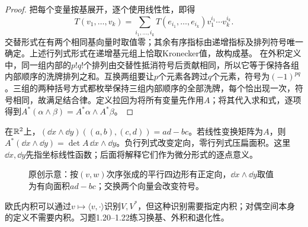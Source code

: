 \begin{proof}
把每个变量按基展开，逐个使用线性性，即得
\[
 T(v_1,\ldots,v_k)=\sum_{i_1,\ldots,i_k}T(e_{i_1},\ldots,e_{i_k})v_1^{i_1}\cdots v_k^{i_k}.
\]
交替形式在有两个相同基向量时取值零；其余有序指标由递增指标及排列符号唯一确定。上述行列式形式在递增基元组上恰取Kronecker值，故构成基。
在外积定义中，同一组内部的$p!q!$个排列由交替性抵消符号后贡献相同，所以它等于保持各组内部顺序的洗牌排列之和。互换两组要让$p$个元素各跨过$q$个元素，符号为$(-1)^{pq}$。三组的两种括号方式都枚举保持三组内部顺序的全部洗牌，每个恰出现一次，符号相同，故满足结合律。定义拉回为将所有变量先作用$A$；将其代入求和式，逐项得到$A^*(\alpha\wedge\beta)=A^*\alpha\wedge A^*\beta$。
\end{proof}
\begin{example}[行列式与面积形式]
在$\mathbb{R}^2$上，$(\dd x\wedge\dd y)((a,b),(c,d))=ad-bc$。若线性变换矩阵为$A$，则$A^*(\dd x\wedge\dd y)=\det A\,\dd x\wedge\dd y$。负行列式改变定向，零行列式压扁面积。这里$\dd x,\dd y$先指坐标线性函数；后面将解释它们作为微分形式的逐点意义。
\end{example}
\begin{figure}[htbp]
\centering

\caption{原创示意：按$(v,w)$次序张成的平行四边形有正定向，$\dd x\wedge\dd y$取值为有向面积$ad-bc$；交换两个向量会改变符号。}
\label{fig:exterior-area}
\end{figure}
欧氏内积可以通过$v\mapsto\langle v,\cdot\rangle$识别$V,V^*$，但这种识别需要指定内积；对偶空间本身的定义不需要内积。习题1.20--1.22练习换基、外积和退化性。
